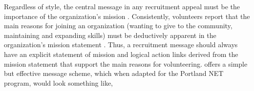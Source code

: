 \documentclass[11pt,fleqn]{book} %
\begin{document}
Regardless of style, the central message in any recruitment appeal must be the importance of the organization's mission \autocite{wymer_jr._conceptual_2001}. Consistently, volunteers report that the main reasons for joining an organization (wanting to give to the
community, maintaining and expanding skills) must be deductively apparent in the organization's mission statement \autocite{ranse_engaging_2010}. Thus, a recruitment message should always have an explicit statement of mission and logical action links derived from the mission statement that support the main reasons for volunteering. \textcite{shields_young_2009} offers a simple but effective message scheme, which when adapted for the Portland NET program, would look something like,\\
\end{document}
